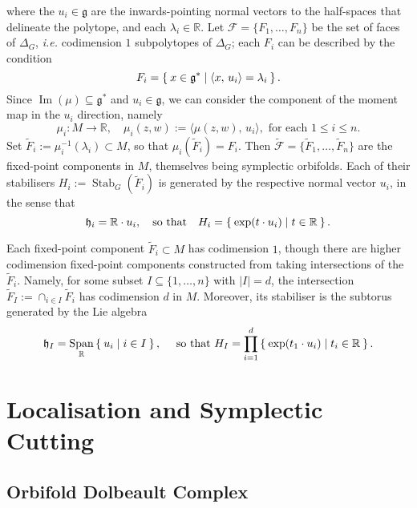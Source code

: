 \documentclass{amsart}
\newcommand{\ie}{\emph{i.e.} }
\newcommand{\ra}{\rightarrow}
\newcommand{\RR}{\mathbb{R}}
\newcommand{\mcF}{\mathcal{F}}
\newcommand{\mfg}{\mathfrak{g}}
\newcommand{\mfh}{\mathfrak{h}}
\DeclareMathOperator{\Image}{Im}
\DeclareMathOperator{\Span}{Span}
\DeclareMathOperator{\Stab}{Stab}
\begin{document}
    where the $u_{i} \in \mfg$ are the inwards-pointing normal vectors to the half-spaces that delineate the polytope, and each $\lambda_{i} \in \mathbb{R}$. Let $\mcF = \{ F_{1}, \ldots, F_{n}\}$ be the set of faces of $\Delta_{G}$, \ie codimension $1$ subpolytopes of $\Delta_{G}$; each $F_{i}$ can be described by the condition
    \[
        F_{i} = \Set{ x \in \mfg^{\ast} | \langle x,\, u_{i} \rangle = \lambda_{i} }.
    \]
    Since $\Image(\mu) \subseteq \mfg^{\ast}$ and $u_{i} \in \mfg$, we can consider the component of the moment map in the $u_{i}$ direction, namely
    \[
        \mu_{i} : M \ra \RR, \quad \mu_{i}(z,w) := \langle \mu(z,w),\, u_{i} \rangle, \text{ for each } 1 \leq i \leq n.
    \]
    Set $\tilde{F}_{i} := \mu_{i}^{-1}(\lambda_{i}) \subset M$, so that $\mu_{i}(\tilde{F}_{i}) = F_{i}$. Then $\tilde{\mcF} = \{\tilde{F}_{1}, \ldots, \tilde{F}_{n}\}$ are the fixed-point components in $M$, themselves being symplectic orbifolds. Each of their stabilisers $H_{i} := \Stab_{G}(\tilde{F}_{i})$ is generated by the respective normal vector $u_{i}$, in the sense that
    \[
    	\mfh_{i} = \RR\cdot u_{i}, \quad \text{so that} \quad H_{i} = \Set{\exp(t\cdot u_{i}) | t \in \RR}.
    \]
    
    Each fixed-point component $\tilde{F}_{i} \subset M$ has codimension $1$, though there are higher codimension fixed-point components constructed from taking intersections of the $\tilde{F}_{i}$. Namely, for some subset $I \subseteq \{1, \ldots, n\}$ with $|I| = d$, the intersection $\tilde{F}_{I} := \cap_{i \in I} \tilde{F}_{i}$ has codimension $d$ in $M$. Moreover, its stabiliser is the subtorus generated by the Lie algebra
    \[
    	\mfh_{I} = \Span_{\RR}\Set{u_{i} | i \in I}, \quad \text{ so that } H_{I} = \prod_{i=1}^{d}\Set{\exp(t_{1}\cdot u_{i}) | t_{i} \in \RR }.
    \]
    	
	\section{Localisation and Symplectic Cutting}
	
	\subsection{Orbifold Dolbeault Complex}
	
\end{document}
